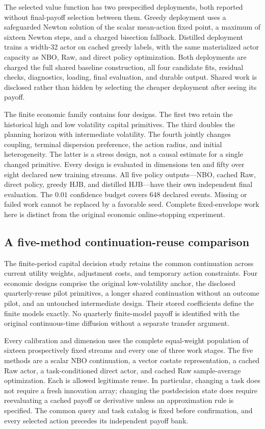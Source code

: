 The selected value function has two prespecified deployments, both reported without final-payoff selection between them. Greedy deployment uses a safeguarded Newton solution of the scalar mean-action fixed point, a maximum of sixteen Newton steps, and a charged bisection fallback. Distilled deployment trains a width-32 actor on cached greedy labels, with the same materialized actor capacity as NBO, Raw, and direct policy optimization. Both deployments are charged the full shared baseline construction, all four candidate fits, residual checks, diagnostics, loading, final evaluation, and durable output. Shared work is disclosed rather than hidden by selecting the cheaper deployment after seeing its payoff.

The finite economic family contains four designs. The first two retain the historical high and low volatility capital primitives. The third doubles the planning horizon with intermediate volatility. The fourth jointly changes coupling, terminal dispersion preference, the action radius, and initial heterogeneity. The latter is a stress design, not a causal estimate for a single changed primitive. Every design is evaluated in dimensions ten and fifty over eight declared new training streams. All five policy outputs---NBO, cached Raw, direct policy, greedy HJB, and distilled HJB---have their own independent final evaluation. The $0.01$ confidence budget covers 648 declared events. Missing or failed work cannot be replaced by a favorable seed. Complete fixed-envelope work here is distinct from the original economic online-stopping experiment.

\subsection{A five-method continuation-reuse comparison}
The finite-period capital decision study retains the common continuation across current utility weights, adjustment costs, and temporary action constraints. Four economic designs comprise the original low-volatility anchor, the disclosed quarterly-reuse pilot primitives, a longer shared continuation without an outcome pilot, and an untouched intermediate design. Their stored coefficients define the finite models exactly. No quarterly finite-model payoff is identified with the original continuous-time diffusion without a separate transfer argument.

Every calibration and dimension uses the complete equal-weight population of sixteen prospectively fixed streams and every one of three work stages. The five methods are a scalar NBO continuation, a vector costate representation, a cached Raw actor, a task-conditioned direct actor, and cached Raw sample-average optimization. Each is allowed legitimate reuse. In particular, changing a task does not require a fresh innovation array; changing the postdecision state does require reevaluating a cached payoff or derivative unless an approximation rule is specified. The common query and task catalog is fixed before confirmation, and every selected action precedes its independent payoff bank.

